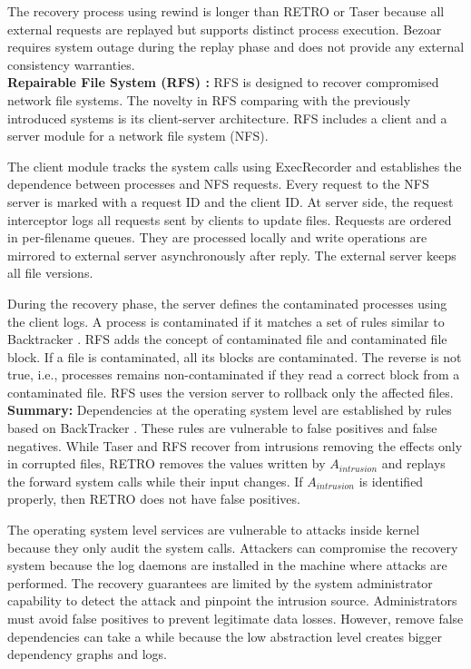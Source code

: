 The recovery process using rewind is longer than RETRO or Taser because all external requests are replayed but supports distinct process execution. Bezoar requires system outage during the replay phase and does not provide any external consistency warranties.\\


\textbf{Repairable File System (RFS) \cite{rfs}:} RFS is designed to recover compromised network file systems. The novelty in RFS comparing with the previously introduced systems is its client-server architecture. RFS includes a client and a server module for a network file system (NFS).

The client module tracks the system calls using ExecRecorder \cite{Oliveira2006} and establishes the dependence between processes and NFS requests. Every request to the NFS server is marked with a request ID and the client ID. At server side, the request interceptor logs all requests sent by clients to update files. Requests are ordered in per-filename queues. They are processed locally and write operations are mirrored to external server asynchronously after reply. The external server keeps all file versions. 

During the recovery phase, the server defines the contaminated processes using the client logs. A process is contaminated if it matches a set of rules similar to Backtracker \cite{backtracker}. RFS adds the concept of contaminated file and contaminated file block. If a file is contaminated, all its blocks are contaminated. The reverse is not true, i.e., processes remains non-contaminated if they read a correct block from a contaminated file. RFS uses the version server to rollback only the affected files. \\



\textbf{Summary:} Dependencies at the operating system level are established by rules based on BackTracker \cite{backtracker}. These rules are vulnerable to false positives and false negatives. While Taser \cite{taser} and RFS \cite{rfs} recover from intrusions removing the effects only in corrupted files, RETRO \cite{retro} removes the values written by $A_{intrusion}$ and replays the forward system calls while their input changes. If $A_{intrusion}$ is identified properly, then RETRO does not have false positives.

The operating system level services are vulnerable to attacks inside kernel because they only audit the system calls. Attackers can compromise the recovery system because the log daemons are installed in the machine where attacks are performed. The recovery guarantees are limited by the system administrator capability to detect the attack and pinpoint the intrusion source. Administrators must avoid false positives to prevent legitimate data losses. However, remove false dependencies can take a while because the low abstraction level creates bigger dependency graphs and logs.



